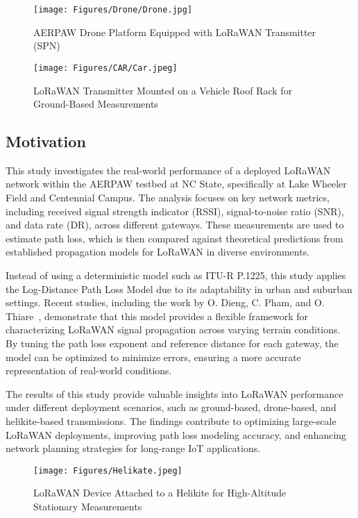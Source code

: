 \documentclass[journal]{IEEEtran}
\begin{document}
\begin{figure}[!t]
    \centering
    \texttt{[image: Figures/Drone/Drone.jpg]}
    \caption{AERPAW Drone Platform Equipped with LoRaWAN Transmitter (SPN)}
    \label{fig:Drone}
\end{figure}

\begin{figure}[!t]
    \centering
    \texttt{[image: Figures/CAR/Car.jpeg]}
    \caption{LoRaWAN Transmitter Mounted on a Vehicle Roof Rack for Ground-Based Measurements}
    \label{fig:Car}
\end{figure}

\subsection{Motivation}

This study investigates the real-world performance of a deployed LoRaWAN network within the AERPAW testbed at NC State, specifically at Lake Wheeler Field and Centennial Campus. The analysis focuses on key network metrics, including received signal strength indicator (RSSI), signal-to-noise ratio (SNR), and data rate (DR), across different gateways. These measurements are used to estimate path loss, which is then compared against theoretical predictions from established propagation models for LoRaWAN in diverse environments.

Instead of using a deterministic model such as ITU-R P.1225, this study applies the Log-Distance Path Loss Model due to its adaptability in urban and suburban settings. Recent studies, including the work by O. Dieng, C. Pham, and O. Thiare~\cite{Dieng2020ComparingNetworks}, demonstrate that this model provides a flexible framework for characterizing LoRaWAN signal propagation across varying terrain conditions. By tuning the path loss exponent and reference distance for each gateway, the model can be optimized to minimize errors, ensuring a more accurate representation of real-world conditions.

The results of this study provide valuable insights into LoRaWAN performance under different deployment scenarios, such as ground-based, drone-based, and helikite-based transmissions. The findings contribute to optimizing large-scale LoRaWAN deployments, improving path loss modeling accuracy, and enhancing network planning strategies for long-range IoT applications.



\begin{figure}[!t]
    \centering
    \texttt{[image: Figures/Helikate.jpeg]}
    \caption{LoRaWAN Device Attached to a Helikite for High-Altitude Stationary Measurements}
    \label{fig:Helikate}
\end{figure}
\end{document}
